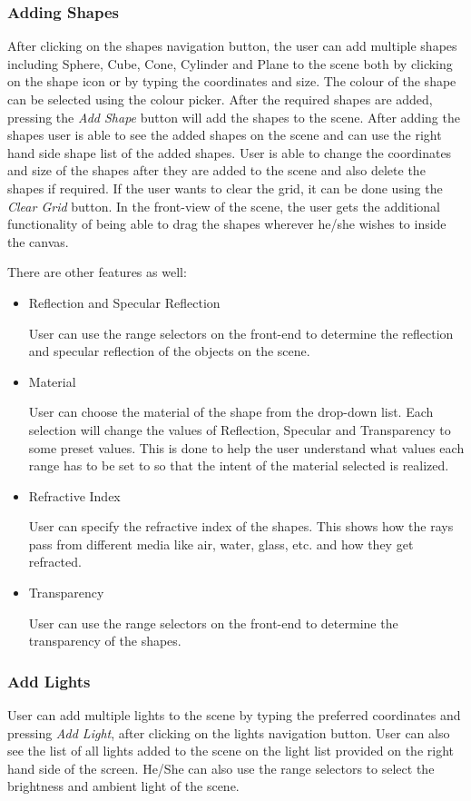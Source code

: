 \documentclass[10pt]{scrartcl}
\begin{document}
\subsubsection{Adding Shapes}
After clicking on the shapes navigation button, the user can add multiple shapes including Sphere, Cube, Cone, Cylinder and Plane to the scene both by clicking on the shape icon or by typing the coordinates and size. The colour of the shape can be selected using the colour picker. After the required shapes are added, pressing the \textit{Add Shape} button will add the shapes to the scene. After adding the shapes user is able to see the added shapes on the scene and can use the right hand side shape list of the added shapes. User is able to change the coordinates and size of the shapes after they are added to the scene and also delete the shapes if required. If the user wants to clear the grid, it can be done using the \textit{Clear Grid} button. In the front-view of the scene, the user gets the additional functionality of being able to drag the shapes wherever he/she wishes to inside the canvas.\par
There are other features as well:
\begin{itemize}
    \item Reflection and Specular Reflection \par
User can use the range selectors on the front-end to determine the reflection and specular reflection of the objects on the scene.
    \item Material \par
    User can choose the material of the shape from the drop-down list. Each selection will change the values of Reflection, Specular and Transparency to some preset values. This is done to help the user understand what values each range has to be set to so that the intent of the material selected is realized.
    \item Refractive Index \par
User can specify the refractive index of the shapes. This shows how the rays pass from different media like air, water, glass, etc. and how they get refracted.
\item Transparency \par
User can use the range selectors on the front-end to determine the transparency of the shapes.
\end{itemize} 

\subsubsection{Add Lights}
User can add multiple lights to the scene by typing the preferred coordinates and pressing \textit{Add Light}, after clicking on the lights navigation button. User can also see the list of all lights added to the scene on the light list provided on the right hand side of the screen. He/She can also use the range selectors to select the brightness and ambient light of the scene.
\end{document}
